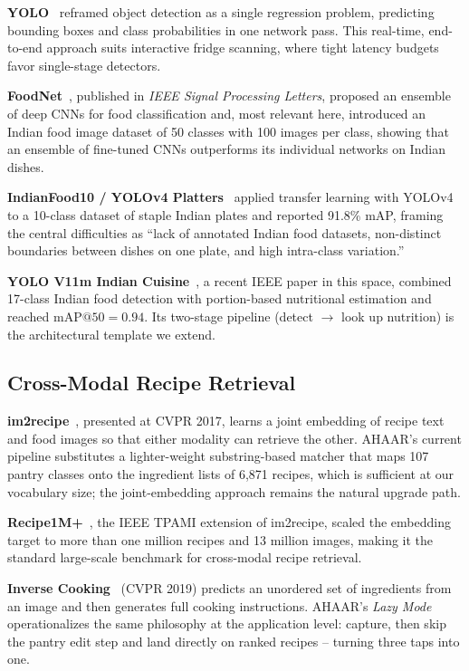 \documentclass[journal]{IEEEtran}
\begin{document}
\textbf{YOLO}~\cite{redmon2016yolo} reframed object detection as a
single regression problem, predicting bounding boxes and class
probabilities in one network pass. This real-time, end-to-end approach
suits interactive fridge scanning, where tight latency budgets favor
single-stage detectors.

\textbf{FoodNet}~\cite{foodnet2017}, published in \textit{IEEE Signal
Processing Letters}, proposed an ensemble of deep CNNs for food
classification and, most relevant here, introduced an Indian
food image dataset of 50 classes with 100 images per class, showing
that an ensemble of fine-tuned CNNs outperforms its individual
networks on Indian dishes.

\textbf{IndianFood10 / YOLOv4 Platters}~\cite{indianfood10} applied
transfer learning with YOLOv4 to a 10-class dataset of staple Indian
plates and reported 91.8\% mAP, framing the central difficulties as
``lack of annotated Indian food datasets, non-distinct boundaries
between dishes on one plate, and high intra-class variation.''

\textbf{YOLO V11m Indian Cuisine}~\cite{yolov11indian2025}, a recent
IEEE paper in this space, combined 17-class Indian food
detection with portion-based nutritional estimation and reached
\(\text{mAP}@50 = 0.94\). Its two-stage pipeline (detect $\rightarrow$
look up nutrition) is the architectural template we extend.

\subsection{Cross-Modal Recipe Retrieval}

\textbf{im2recipe}~\cite{salvador2017im2recipe}, presented at CVPR
2017, learns a joint embedding of recipe text and food images so that
either modality can retrieve the other. AHAAR's current pipeline
substitutes a lighter-weight substring-based matcher that maps 107
pantry classes onto the ingredient lists of 6{,}871 recipes, which is
sufficient at our vocabulary size; the joint-embedding approach
remains the natural upgrade path.

\textbf{Recipe1M+}~\cite{marin2021recipe1m}, the IEEE TPAMI extension
of im2recipe, scaled the embedding target to more than one million
recipes and 13 million images, making it the standard large-scale
benchmark for cross-modal recipe retrieval.

\textbf{Inverse Cooking}~\cite{salvador2019inverse} (CVPR 2019)
predicts an unordered set of ingredients from an image and then
generates full cooking instructions. AHAAR's \textit{Lazy Mode}
operationalizes the same philosophy at the application level:
capture, then skip the pantry edit step and land directly on ranked
recipes -- turning three taps into one.
\end{document}
